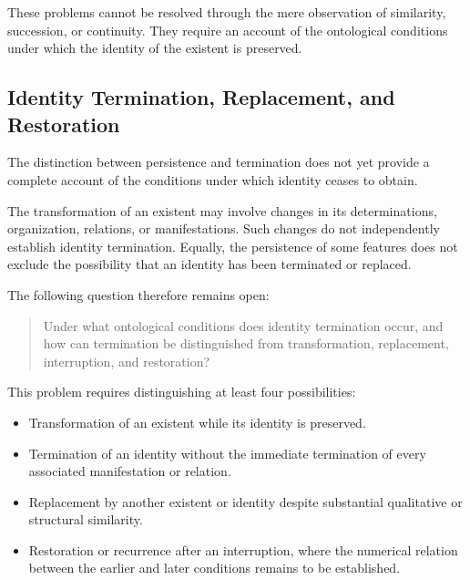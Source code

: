 These problems cannot be resolved through the mere
observation of similarity, succession, or continuity.
They require an account of the ontological conditions
under which the identity of the existent is preserved.


\subsection{Identity Termination, Replacement, and Restoration}

The distinction between persistence and termination
does not yet provide a complete account of the
conditions under which identity ceases to obtain.

The transformation of an existent may involve changes
in its determinations, organization, relations, or
manifestations. Such changes do not independently
establish identity termination. Equally, the persistence
of some features does not exclude the possibility
that an identity has been terminated or replaced.

The following question therefore remains open:

\begin{quote}
Under what ontological conditions does identity
termination occur, and how can termination be
distinguished from transformation, replacement,
interruption, and restoration?
\end{quote}

This problem requires distinguishing at least four
possibilities:

\begin{itemize}
    \item Transformation of an existent while its
    identity is preserved.
    \item Termination of an identity without the
    immediate termination of every associated
    manifestation or relation.
    \item Replacement by another existent or identity
    despite substantial qualitative or structural
    similarity.
    \item Restoration or recurrence after an interruption,
    where the numerical relation between the earlier
    and later conditions remains to be established.
\end{itemize}

